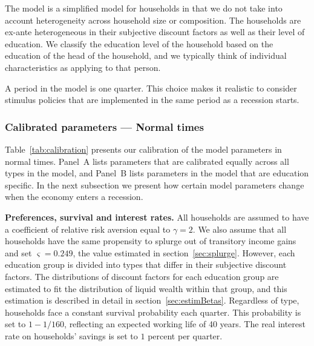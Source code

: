 \documentclass[\econtexRoot/HAFiscal]{subfiles}
\begin{document}
The model is a simplified model for households in that we do not take into account heterogeneity across household size or composition.
The households are ex-ante heterogeneous in their subjective discount factors as well as their level of education.
We classify the education level of the household based on the education of the head of the household, and we typically think of individual characteristics as applying to that person.


A period in the model is one quarter.
This choice makes it realistic to consider stimulus policies that are implemented in the same period as a recession starts.


\subsubsection{Calibrated parameters --- Normal times} 
\notinsubfile{\label{sec:calib}}

Table~\ref{tab:calibration} presents our calibration of the model parameters in normal times. Panel~A lists parameters that are calibrated equally across all types in the model, and Panel~B lists parameters in the model that are education specific. In the next subsection we present how certain model parameters change when the economy enters a recession.

\textbf{Preferences, survival and interest rates.} All households are assumed to have a coefficient of relative risk aversion equal to $\gamma=2$.
We also assume that all households have the same propensity to splurge out of transitory income gains and set $\varsigma=0.249$, the value estimated in section~\ref{sec:splurge}.
However, each education group is divided into types that differ in their subjective discount factors.
The distributions of discount factors for each education group are estimated to fit the distribution of liquid wealth within that group, and this estimation is described in detail in section~\ref{sec:estimBetas}.
Regardless of type, households face a constant survival probability each quarter.
This probability is set to $1-1/160$, reflecting an expected working life of 40 years.
The real interest rate on households' savings is set to $1$ percent per quarter.
\end{document}
